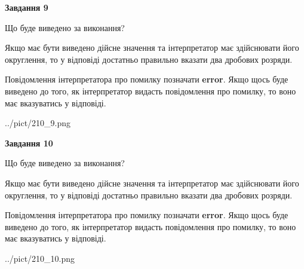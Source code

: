 \documentclass[12pt, ukrainian]{article}
\begin{document}
{\begin {Large}
{\begin {center}\textbf{Завдання 9}\end {center}}\par
Що буде виведено за виконання? \par

Якщо має бути виведено дійсне значення та інтерпретатор має здійснювати його округлення, 
то у відповіді достатньо правильно вказати два дробових розряди.

Повідомлення інтерпретатора про помилку позначати \textbf{error}.
Якщо щось буде виведено до того, як інтерпретатор видасть повідомлення про помилку, 
то воно має вказуватись у відповіді. \par

\begin{center}
	{../pict/210_9.png}
\end{center}
\newpage

{\begin {center}\textbf{Завдання 10}\end {center}}\par
Що буде виведено за виконання? \par

Якщо має бути виведено дійсне значення та інтерпретатор має здійснювати його округлення, 
то у відповіді достатньо правильно вказати два дробових розряди.

Повідомлення інтерпретатора про помилку позначати \textbf{error}.
Якщо щось буде виведено до того, як інтерпретатор видасть повідомлення про помилку, 
то воно має вказуватись у відповіді. \par

\begin{center}
	{../pict/210_10.png}
\end{center}
\newpage

\end {Large}}
\end{document}
